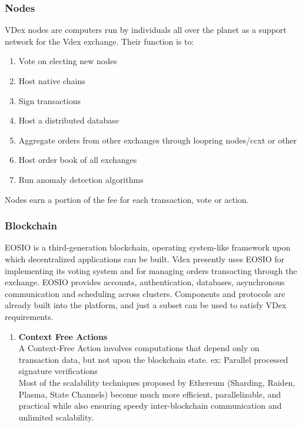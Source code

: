 \documentclass[]{article}
\begin{document}
{\subsubsection{Nodes}
VDex nodes are computers run by individuals all over the planet as a support network for the Vdex exchange. 
Their function is to:\
\begin{enumerate}
	\item Vote on electing new nodes
	\item Host native chains
	\item Sign transactions
	\item Host a distributed database
	\item Aggregate orders from other exchanges through loopring nodes/ccxt or other 
	\item Host order book of all exchanges
	\item Run anomaly detection algorithms

\end{enumerate}
Nodes earn a portion of the fee for each transaction, vote or action.
	
	\subsubsection{Blockchain}
	
	EOSIO is a third-generation blockchain, operating system-like framework upon which decentralized applications can be built.
	Vdex presently uses EOSIO for implementing its voting system and for managing orders transacting through the exchange. 
	EOSIO provides accounts, authentication, databases, asynchronous communication and scheduling across clusters. 
	Components and protocols are already built into the platform, and just a subset can be used to satisfy VDex requirements. 
	
	\begin{enumerate}
					
	        \item \textbf{Context Free Actions} \\
	A Context-Free Action involves computations that depend only on transaction data, but not upon the blockchain state.
	ex: Parallel processed signature verifications\\
	Most of the scalability techniques proposed by Ethereum (Sharding, Raiden, Plasma, State Channels) 
	become much more efficient, parallelizable, and practical while also ensuring speedy inter-blockchain communication and unlimited scalability.
	

\end{enumerate}}
\end{document}
